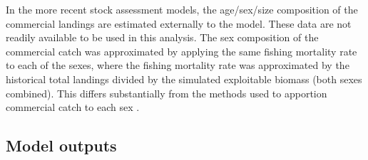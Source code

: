 In the more recent stock assessment models, the age/sex/size composition of the commercial landings are estimated externally to the model.  These data are not readily available to be used in this analysis.  The sex composition of the commercial catch was approximated by applying the same fishing mortality rate to each of the sexes, where the fishing mortality rate was approximated by the historical total landings divided by the simulated exploitable biomass (both sexes combined).  This differs substantially from the methods used to apportion commercial catch to each sex \cite[see][for details]{clark2004method}.



\subsection{Model outputs} %
\label{sub:model_outputs}




